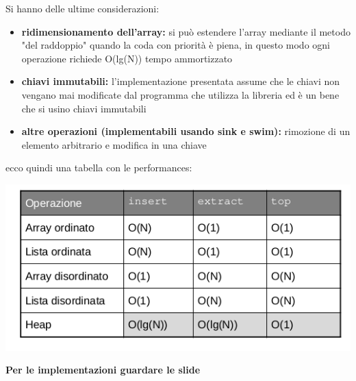 \documentclass[a4paper,12pt, oneside]{book}
\begin{document}
Si hanno delle ultime considerazioni:
\begin{itemize}
	\item \textbf{ridimensionamento dell'array: }si può estendere l'array mediante il metodo "del raddoppio" quando
	      la coda con priorità è piena, in questo modo ogni operazione richiede O(lg(N)) tempo
	      ammortizzato
	\item \textbf{chiavi immutabili:} l'implementazione presentata assume che le chiavi non vengano
	      mai modificate dal programma che utilizza la libreria ed è un bene che si usino chiavi immutabili
	\item \textbf{altre operazioni (implementabili usando sink e swim):} rimozione di un elemento arbitrario e modifica in una chiave
\end{itemize}
\newpage
ecco quindi una tabella con le performances:
\begin{center}
	\includegraphics[scale=2.5]{img/c14.png}
\end{center}
\textbf{Per le implementazioni guardare le slide}
\end{document}

